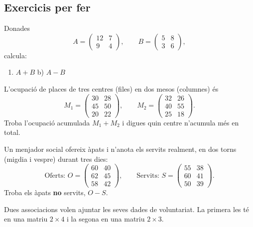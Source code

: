 \subsection{Exercicis per fer}

\begin{exercicis}
\begin{exlist}
  \item Donades
        \[ A=\begin{pmatrix} 12 & 7 \\ 9 & 4 \end{pmatrix},\qquad
           B=\begin{pmatrix} 5 & 8 \\ 3 & 6 \end{pmatrix}, \]
        calcula:
        \begin{enumerate}[label=\alph*), leftmargin=1.6em, topsep=2pt]
          \item $A+B$ \qquad b) $A-B$
        \end{enumerate}
  \item L'ocupació de places de tres centres (files) en dos mesos (columnes) és
        \[ M_1=\begin{pmatrix} 30 & 28 \\ 45 & 50 \\ 20 & 22 \end{pmatrix},\qquad
           M_2=\begin{pmatrix} 32 & 26 \\ 40 & 55 \\ 25 & 18 \end{pmatrix}. \]
        Troba l'ocupació acumulada $M_1+M_2$ i digues quin centre n'acumula més en
        total.
  \item Un menjador social ofereix àpats i n'anota els servits realment, en dos
        torns (migdia i vespre) durant tres dies:
        \[ \text{Oferts: } O=\begin{pmatrix} 60 & 40 \\ 62 & 45 \\ 58 & 42 \end{pmatrix},\qquad
           \text{Servits: } S=\begin{pmatrix} 55 & 38 \\ 60 & 41 \\ 50 & 39 \end{pmatrix}. \]
        Troba els àpats \textbf{no} servits, $O-S$.
  \item Dues associacions volen ajuntar les seves dades de voluntariat. La primera
        les té en una matriu $2\times 4$ i la segona en una matriu $2\times 3$.

\end{exlist}
\end{exercicis}
